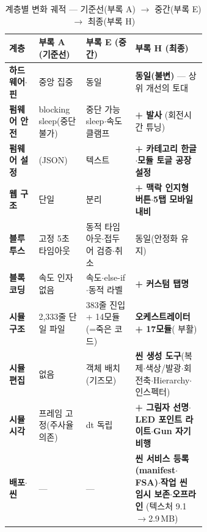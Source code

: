 \begin{table}[htbp]\centering\small
\caption{계층별 변화 궤적 --- 기준선(부록 A) $\to$ 중간(부록 E) $\to$ 최종(부록 H)}
\renewcommand{\arraystretch}{1.28}
\begin{tabularx}{\linewidth}{@{}>{\sffamily\bfseries}L{0.15\linewidth} L{0.24\linewidth} L{0.25\linewidth} >{\raggedright\arraybackslash}X@{}}
\toprule
\sffamily 계층 & \sffamily 부록 A (기준선) & \sffamily 부록 E (중간) & \sffamily 부록 H (최종) \\
\midrule
하드웨어$\cdot$핀 &  중앙 집중 & 동일 & \textbf{동일(불변)} --- 상위 개선의 토대 \\
펌웨어 안전 & blocking sleep(중단 불가) & 중단 가능 sleep$\cdot$속도 클램프 & \textbf{+ 발사 }(회전시간 튜닝) \\
펌웨어 설정 & (JSON) &  텍스트 & \textbf{+ 카테고리 한글$\cdot$모듈 토글 공장 설정} \\
웹 구조 & 단일  &  분리 & \textbf{+ 맥락 인지형 버튼$\cdot$5탭 모바일 내비} \\
블루투스 & 고정 5초 타임아웃 & 동적 타임아웃$\cdot$접두어 검증$\cdot$취소 & 동일(안정화 유지) \\
블록코딩 & 속도 인자 없음 & 속도$\cdot$else-if$\cdot$동적 라벨 & \textbf{+  커스텀 탭명} \\
시뮬 구조 & 2{,}333줄 단일 파일 & 383줄 진입 + 14모듈(=죽은 코드) & \textbf{ 오케스트레이터 + 17모듈}( 부활) \\
시뮬 편집 & 없음 & 객체 배치(기즈모) & \textbf{씬 생성 도구}(복제$\cdot$색상/발광$\cdot$회전축$\cdot$Hierarchy$\cdot$인스펙터) \\
시뮬 시각 & 프레임 고정(주사율 의존) & dt 독립 & \textbf{+ 그림자 선명$\cdot$LED 포인트 라이트$\cdot$Gun 자기비행} \\
배포$\cdot$씬 & --- & --- & \textbf{씬 서비스 등록(manifest$\cdot$FSA)$\cdot$작업 씬 임시 보존$\cdot$오프라인 }(텍스처 9.1$\to$2.9\,MB) \\
\bottomrule
\end{tabularx}
\end{table}


